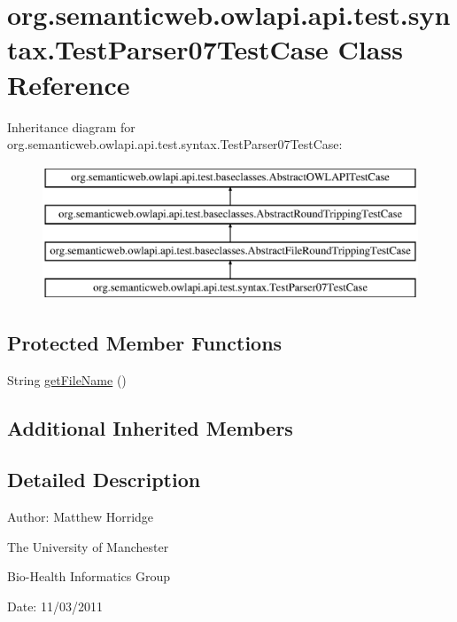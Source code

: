 \hypertarget{classorg_1_1semanticweb_1_1owlapi_1_1api_1_1test_1_1syntax_1_1_test_parser07_test_case}{\section{org.\-semanticweb.\-owlapi.\-api.\-test.\-syntax.\-Test\-Parser07\-Test\-Case Class Reference}
\label{classorg_1_1semanticweb_1_1owlapi_1_1api_1_1test_1_1syntax_1_1_test_parser07_test_case}
}
Inheritance diagram for org.\-semanticweb.\-owlapi.\-api.\-test.\-syntax.\-Test\-Parser07\-Test\-Case\-:\begin{figure}[H]
\begin{center}
\leavevmode
\includegraphics[height=4.000000cm]{classorg_1_1semanticweb_1_1owlapi_1_1api_1_1test_1_1syntax_1_1_test_parser07_test_case}
\end{center}
\end{figure}
\subsection*{Protected Member Functions}
\begin{DoxyCompactItemize}
\item 
String \hyperlink{classorg_1_1semanticweb_1_1owlapi_1_1api_1_1test_1_1syntax_1_1_test_parser07_test_case_a4a4197478c91bfa679460adb57635cc1}{get\-File\-Name} ()
\end{DoxyCompactItemize}
\subsection*{Additional Inherited Members}


\subsection{Detailed Description}
Author\-: Matthew Horridge\par
 The University of Manchester\par
 Bio-\/\-Health Informatics Group\par
 Date\-: 11/03/2011 

